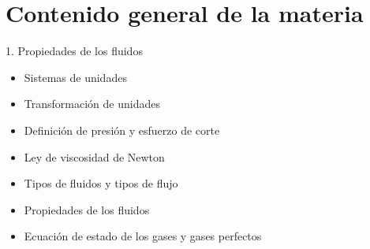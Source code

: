 \documentclass [xcolor=svgnames, t] {beamer}
\begin{document}
\section{Contenido general de la materia}

\begin{frame}{1. Propiedades de los fluidos}
\begin{exampleblock}{}
\begin{itemize}
\item Sistemas de unidades
\item Transformación de unidades
\item Definición de presión y esfuerzo de corte
\item Ley de viscosidad de Newton
\item Tipos de fluidos y tipos de flujo
\item Propiedades de los fluidos
\item Ecuación de estado de los gases y gases perfectos
\end{itemize}
\end{exampleblock}
\end{frame}
\end{document}
